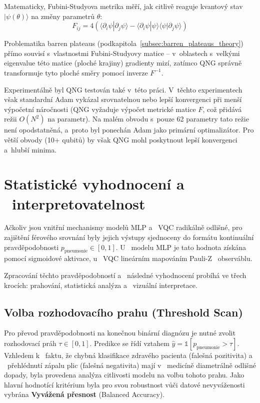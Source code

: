 \documentclass[12pt, a4paper]{report}
\begin{document}
Matematicky, Fubini-Studyova metrika měří, jak citlivě reaguje kvantový stav $|\psi(\theta)\rangle$ na změny parametrů $\theta$:
\begin{equation}
    F_{ij} = 4 \left( \langle \partial_i \psi | \partial_j \psi \rangle - \langle \partial_i \psi | \psi \rangle \langle \psi | \partial_j \psi \rangle \right)
\end{equation}

Problematika barren plateaus (podkapitola~\ref{subsec:barren_plateaus_theory}) přímo souvisí s~vlastnostmi Fubini-Studyovy matice – v~oblastech s~velkými eigenvalue této matice (ploché krajiny) gradienty mizí, zatímco QNG správně transformuje tyto ploché směry pomocí inverze $F^{-1}$.

Experimentálně byl QNG testován také v~této práci. V~těchto experimentech však standardní Adam vykázal srovnatelnou nebo lepší konvergenci při menší výpočetní náročnosti (QNG vyžaduje výpočet metrické matice $F$, což přidává režii $O(N^2)$ na parametr). Na malém obvodu s~pouze 62 parametry tato režie není opodstatněná, a~proto byl ponechán Adam jako primární optimalizátor. Pro větší obvody (10+ qubitů) by však QNG mohl poskytnout lepší konvergenci a~hlubší minima.

\section{Statistické vyhodnocení a ~interpretovatelnost} \label{sec:evaluation}

Ačkoliv jsou vnitřní mechanismy modelů MLP a ~VQC radikálně odlišné, pro zajištění férového srovnání byly jejich výstupy sjednoceny do formátu kontinuální pravděpodobnosti $p_{\text{pneumonie}} \in [0,1]$. U ~modelu MLP je tato hodnota získána pomocí sigmoidové aktivace, u ~VQC lineárním mapováním Pauli-Z ~observáblu.

Zpracování těchto pravděpodobností a ~následné vyhodnocení probíhá ve třech krocích: prahování, statistická analýza a ~vizuální interpretace.

\subsection{Volba rozhodovacího prahu (Threshold Scan)}
Pro převod pravděpodobnosti na konečnou binární diagnózu je nutné zvolit rozhodovací práh $\tau \in [0,1]$. Predikce se řídí vztahem $\hat{y} = \mathbb{1}[p_{\text{pneumonie}} > \tau]$. Vzhledem k ~faktu, že chybná klasifikace zdravého pacienta (falešná pozitivita) a ~přehlédnutí zápalu plic (falešná negativita) mají v ~medicíně diametrálně odlišné dopady, byla provedena analýza citlivosti modelu na volbu tohoto prahu. Jako hlavní hodnotící kritérium byla pro svou robustnost vůči datové nevyváženosti vybrána \textbf{Vyvážená přesnost} (Balanced Accuracy).
\end{document}
